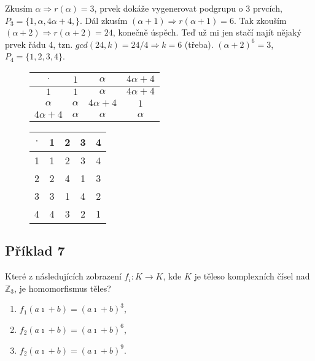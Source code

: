 \documentclass{article}
\begin{document}
Zkusím $\alpha \Rightarrow r(\alpha)=3$, prvek dokáže vygenerovat podgrupu o 3 prvcích, $P_3=\{1,\alpha,4\alpha+4,\}$. Dál zkusím $(\alpha+1) \Rightarrow r(\alpha+1)=6$. Tak zkouším $(\alpha+2) \Rightarrow r(\alpha+2)=24$, konečně úspěch. Teď už mi jen stačí najít nějaký prvek řádu 4, tzn. $gcd(24,k)=24/4 \Rightarrow k = 6$ (třeba). $(\alpha+2)^6 = 3$, $P_4 = \{1,2,3,4\}$.

\begin{figure}[h]
  \centering
  \hfill
  \begin{minipage}[t]{.35\textwidth}
    \begin{tabular}{c||c|c|c}
		 $\cdot$ 		& $1$ 					&		$\alpha$ 			& $4\alpha+4$  \\ 
			\hline
			\hline
			$1$ 				& $1$ 					&  $\alpha$ 	&  $4\alpha+4$ \\ 
			\hline
			$\alpha$ 		& $\alpha$ 			&$4\alpha+4$  &  $1$ \\ 
			\hline
			$4\alpha+4$ &  $\alpha$ 		&  $\alpha$ 	& $\alpha$ \\ 
		\end{tabular}
  \end{minipage}
  \hfill
  \begin{minipage}[t]{.35\textwidth}
 	\begin{tabular}{c||c|c|c|c}
			$\cdot$ 		& 1	&	2 & 3 & 4  \\ 
			\hline
			\hline
			1	& 1	&	2 & 3 & 4 \\ 
			\hline
			2 & 2	&	4 & 1 & 3 \\ 
			\hline
			3 & 3	&	1 & 4 & 2 \\ 
			\hline
			4 & 4	&	3 & 2 & 1
		\end{tabular}
		
	\end{minipage}
  \hfill
\end{figure}


\subsection{Příklad 7}
Které z následujících zobrazení $f_i: K \rightarrow K$, kde $K$ je těleso komplexních čísel nad $\mathbb{Z}_3$, je homomorfismus těles?

\begin{enumerate}
	\item $f_1(a\imath + b) = (a\imath + b)^3$,
	\item $f_2(a\imath + b) = (a\imath + b)^6$,
	\item $f_2(a\imath + b) = (a\imath + b)^9$.
\end{enumerate}
\end{document}
